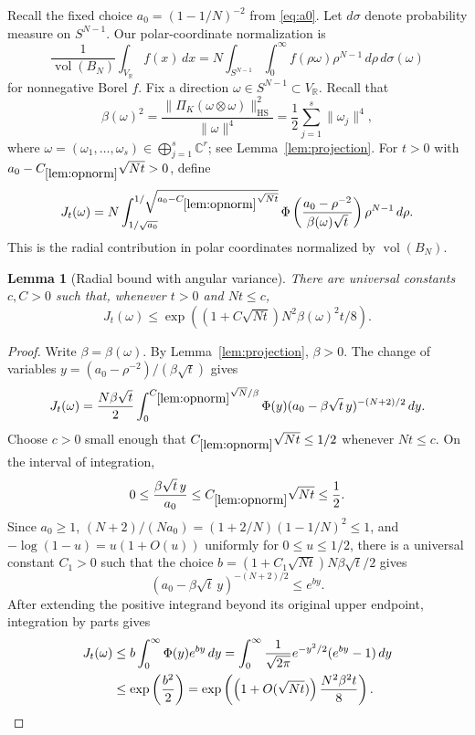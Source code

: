 \documentclass[11pt]{article}
\newtheorem{lemma}[theorem]{Lemma}
\theoremstyle{remark}
\newcommand{\R}{\mathbb R}
\newcommand{\C}{\mathbb C}
\newcommand{\vol}{\operatorname{vol}}
\newcommand{\HS}{\operatorname{HS}}
\begin{document}
Recall the fixed choice $a_0=(1-1/N)^{-2}$ from
\eqref{eq:a0}.  Let $d\sigma$ denote probability measure on
$S^{N-1}$.  Our polar-coordinate normalization is
\[
        \frac1{\vol(B_N)}\int_{V_\R} f(x)\,dx
        =N\int_{S^{N-1}}\int_0^\infty f(\rho\omega)\rho^{N-1}\,d\rho\,d\sigma(\omega)
\]
for nonnegative Borel $f$.  Fix a direction $\omega\in S^{N-1}\subset V_\R$.
Recall that
\[
        \beta(\omega)^2
        =\frac{\|\Pi_K(\omega\otimes\omega)\|_{\HS}^2}{\|\omega\|^4}
        =\frac12\sum_{j=1}^s\|\omega_j\|^4,
\]
where $\omega=(\omega_1,\dots,\omega_s)\in\bigoplus_{j=1}^s\C^r$; see
Lemma~\ref{lem:projection}.  For $t>0$ with
$a_0-C_{\ref{lem:opnorm}}\sqrt{Nt}>0$, define
\begin{equation}
        J_t(\omega)
        =N\int_{1/\sqrt{a_0}}^{1/\sqrt{a_0-C_{\ref{lem:opnorm}}\sqrt{Nt}}}
        \Phi\left(
        \frac{a_0-\rho^{-2}}{\beta(\omega)\sqrt t}
        \right)
        \rho^{N-1}\,d\rho.
\label{eq:Jt}
\end{equation}
This is the radial contribution in polar coordinates normalized by
$\vol(B_N)$.

\begin{lemma}[Radial bound with angular variance]\label{lem:radial}
There are universal constants $c,C>0$ such that, whenever $t>0$ and $Nt\le c$,
\[
        J_t(\omega)
        \le \exp\left(
        \left(1+C\sqrt{Nt}\right)
        N^2\beta(\omega)^2t/8
        \right).
\]
\end{lemma}

\begin{proof}
Write $\beta=\beta(\omega)$.  By Lemma~\ref{lem:projection}, $\beta>0$.
The change of variables $y=(a_0-\rho^{-2})/(\beta\sqrt t)$ gives
\[
        J_t(\omega)
        =\frac{N\beta\sqrt t}{2}
        \int_0^{C_{\ref{lem:opnorm}}\sqrt N/\beta}
        \Phi(y)(a_0-\beta\sqrt t\,y)^{-(N+2)/2}\,dy.
\]
Choose $c>0$ small enough that
$C_{\ref{lem:opnorm}}\sqrt{Nt}\le1/2$ whenever $Nt\le c$.  On the interval of
integration,
\[
        0\le\frac{\beta\sqrt t\,y}{a_0}
        \le C_{\ref{lem:opnorm}}\sqrt{Nt}\le\frac12.
\]
Since $a_0\ge1$,
$(N+2)/(Na_0)=(1+2/N)(1-1/N)^2\le1$, and
$-\log(1-u)=u(1+O(u))$ uniformly for $0\le u\le1/2$, there is a universal
constant $C_1>0$ such that the choice
$b=(1+C_1\sqrt{Nt})N\beta\sqrt t/2$ gives
\[
        (a_0-\beta\sqrt t\,y)^{-(N+2)/2}\le e^{by}.
\]
After extending the positive integrand beyond its original upper endpoint,
integration by parts gives
\begin{align*}
        J_t(\omega)
        &\le b\int_0^\infty\Phi(y)e^{by}\,dy
        =\int_0^\infty \frac1{\sqrt{2\pi}}e^{-y^2/2}(e^{by}-1)\,dy
        \\
        &\le \exp\left(\frac{b^2}{2}\right)
        =\exp\left(
        \left(1+O(\sqrt{Nt})\right)\frac{N^2\beta^2t}{8}
        \right).\qedhere
\end{align*}
\end{proof}
\end{document}
